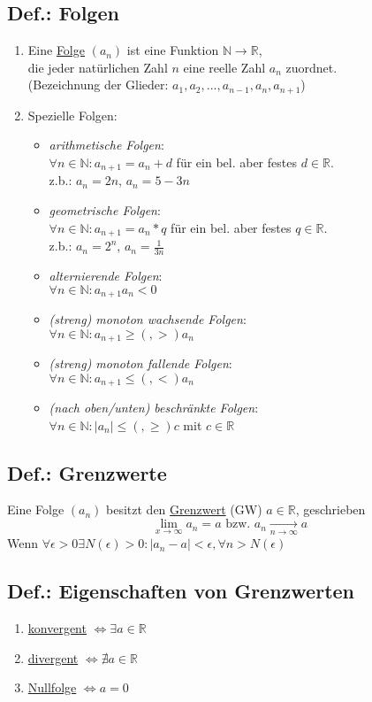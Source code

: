 \documentclass[a4paper,11pt]{article}
\begin{document}
\subsection{Def.: Folgen}
\begin{enumerate}[label={\alph*)}]
	\item Eine \underline{Folge} $(a_n)$ ist eine Funktion $\mathbb{N}\rightarrow\mathbb{R}$,\\
		die jeder natürlichen Zahl $n$ eine reelle Zahl $a_n$ zuordnet.\\
		(Bezeichnung der Glieder: $a_1,a_2,...,a_{n-1},a_n,a_{n+1}$)
	\item Spezielle Folgen:
		\begin{itemize}
			\item \emph{arithmetische Folgen}:\\
				$\forall n\in \mathbb{N}:a_{n+1}=a_n+d$ für ein bel. aber festes $d\in\mathbb{R}$.\\
				z.b.: $a_n=2n$, $a_n=5-3n$
			\item \emph{geometrische Folgen}:\\
				$\forall n\in \mathbb{N}:a_{n+1}=a_n*q$ für ein bel. aber festes $q\in\mathbb{R}$.\\
				z.b.: $a_n=2^n$, $a_n=\frac{1}{3n}$
			\item \emph{alternierende Folgen}:\\
				$\forall n\in\mathbb{N}:a_{n+1}a_n<0$
			\item \emph{(streng) monoton wachsende Folgen}:\\
				$\forall n\in\mathbb{N}:a_{n+1}\geq(,>)a_n$
			\item \emph{(streng) monoton fallende Folgen}:\\
				$\forall n\in\mathbb{N}:a_{n+1}\leq(,<)a_n$
			\item \emph{(nach oben/unten) beschränkte Folgen}:\\
				$\forall n\in\mathbb{N}:|a_n|\leq(,\geq) c$ mit $c\in\mathbb{R}$
		\end{itemize}
\end{enumerate}
\subsection{Def.: Grenzwerte}
	Eine Folge $(a_n)$ besitzt den \underline{Grenzwert} (GW) $a\in\mathbb{R}$, geschrieben
	\[\lim_{x\to\infty}a_n=a \text{ bzw. } a_n\underset{{n\to\infty}}{\to}a\]
	Wenn $\forall \epsilon>0\exists N(\epsilon)>0:|a_n-a|<\epsilon, \forall n>N(\epsilon)$
\subsection{Def.: Eigenschaften von Grenzwerten}
\begin{enumerate}[label={\alph*)}]
	\item \underline{konvergent} $\Leftrightarrow\exists a\in\mathbb{R}$
	\item \underline{divergent} $\Leftrightarrow\nexists a\in\mathbb{R}$
	\item \underline{Nullfolge} $\Leftrightarrow a = 0$
\end{enumerate}
\end{document}

